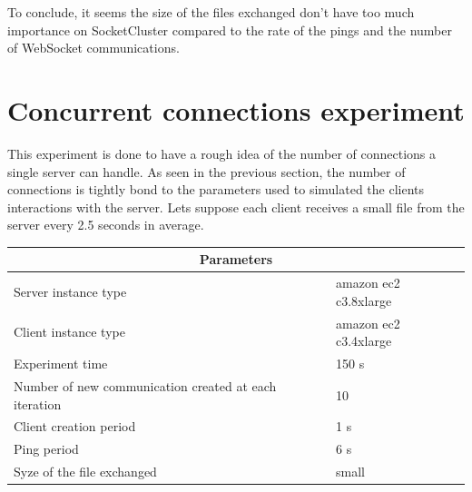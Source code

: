 To conclude, it seems the size of the files exchanged don't have too much
importance on SocketCluster compared to the rate of the pings and the number
of WebSocket communications. 


\section{Concurrent connections experiment}

This experiment is done to have a rough idea of the number of connections a
single server can handle. As seen in the previous section, the number of
connections is tightly bond to the parameters used to simulated the clients
interactions with the server.  Lets suppose each client receives a small file
from the server every 2.5 seconds in average.

\begin{center}
  \begin{tabular}{ | l | l |}
  \hline
  \multicolumn{2}{|c|}{Parameters} \\
  \hline
    Server instance type &  amazon ec2 c3.8xlarge\\ 
    Client instance type & amazon ec2 c3.4xlarge\\
    Experiment time & 150 s \\
    Number of new communication created at each iteration & 10 \\
    Client creation period & 1 s \\
    Ping period & 6 s \\ 
    Syze of the file exchanged & small \\
  \hline
  \end{tabular}
\end{center}


